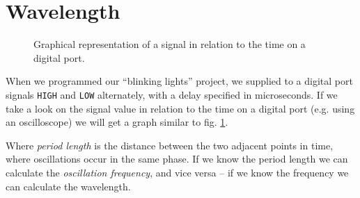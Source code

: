 \documentclass[../sparc.tex]{subfiles}
\begin{document}
\section{Wavelength}

\begin{figure}[ht]
  \caption{Graphical representation of a signal in relation to the time on a
    digital port.}
  \label{fig:blinking-led-graph}
\end{figure}

When we programmed our ``blinking lights'' project, we supplied to a digital
port signals \texttt{HIGH} and \texttt{LOW} alternately, with a delay specified
in microseconds.  If we take a look on the signal value in relation to the time
on a digital port (e.g. using an oscilloscope) we will get a graph similar to
fig. \ref{fig:blinking-led-graph}.

Where \emph{period length} is the distance between the two adjacent points in
time, where oscillations occur in the same phase.  If we know the period length
we can calculate the \emph{oscillation frequency}, and vice versa -- if we know
the frequency we can calculate the wavelength.
\end{document}
